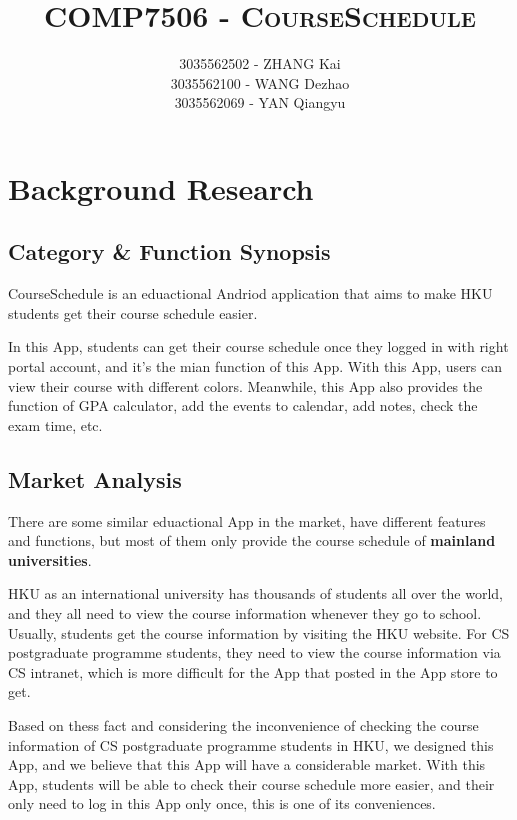 \documentclass{article}
\title{\textsc{COMP7506 - CourseSchedule}}
\author{	
                3035562502 - ZHANG Kai \\
                3035562100 - WANG Dezhao \\
                3035562069 - YAN Qiangyu }
\date{}
\begin{document}
    \maketitle
    
    
    \section{Background Research}

    \subsection{Category \& Function Synopsis}
    CourseSchedule is an eduactional Andriod application that aims to 
    make HKU students get their course schedule easier.
    
    In this App, students can get their course schedule
    once they logged in with right portal account, 
    and it's the mian function of this App.
    With this App, users can view their course with different colors.
    Meanwhile, this App also provides the function of GPA calculator,
    add the events to calendar, add notes, check the exam time, etc.

    \subsection{Market Analysis}
    There are some similar eduactional App in the market, 
    have different features and functions,
    but most of them only provide the course schedule of \textbf{mainland universities}.
    
    HKU as an international university has thousands of students 
    all over the world, and they all need to view the course information
    whenever they go to school. 
    Usually, students get the course information by visiting the HKU website.
    For CS postgraduate programme students, they need to view 
    the course information via CS intranet, which is more difficult for
    the App that posted in the App store to get.
    
    Based on thess fact and considering the inconvenience of 
    checking the course information of
    CS postgraduate programme students in HKU, 
    we designed this App, and we believe that
    this App will have a considerable market.
    With this App, students will be able to check their course schedule
    more easier, and their only need to log in this App only once,
    this is one of its conveniences.
\end{document}
